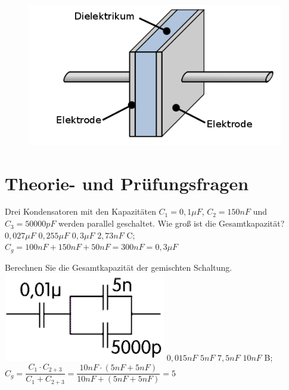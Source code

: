 

\begin{figure}
 \vspace{-6cm}
  \includegraphics[scale=0.45]{Kondensator/Bilder/Kondensator.png}
 \vspace{-6cm}
\end{figure}

\section*{Theorie- und Prüfungsfragen}





{
Drei Kondensatoren mit den Kapazitäten $C_1 = 0,1\mu F$, $C_2 = 150nF$ und $C_3 = 50000pF$ werden parallel geschaltet. Wie groß ist die Gesamtkapazität?
}%
{$0,027\mu F$}%
{$0,255\mu F$}%
{$0,3\mu F$}%
{$2,73nF$}%
{C; $C_g = 100nF + 150nF + 50nF = 300nF = 0,3\mu F$}%


{
Berechnen Sie die Gesamtkapazität der gemischten Schaltung.\\
\includegraphics[scale=0.35]{Kondensator/Bilder/TD105.png}
}%
{$0,015nF$}%
{$5nF$}%
{$7,5nF$}%
{$10nF$}%
{B; $C_g = \dfrac{C_1 \cdot C_{2+3}}{C_1 + C_{2+3}} = \dfrac{10nF \cdot (5nF + 5nF)}{10nF + (5nF + 5nF)} = 5$}%

